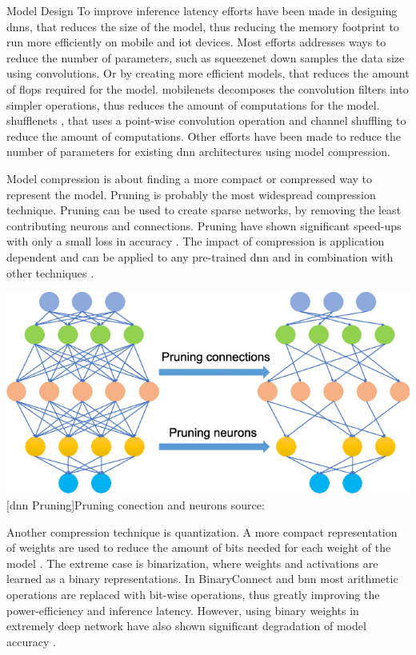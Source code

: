 \begin{enumdescript}
	\item[Model Design] To improve inference latency efforts have been made in designing \gls{dnn}s, that reduces the size of the model, thus reducing the memory footprint to run more efficiently on mobile and \gls{iot} devices. Most efforts addresses ways to reduce the number of parameters, such as \gls{squeezenet} \cite{iandola_squeezenet:_2016} down samples the data size using convolutions. Or by creating more efficient models, that reduces the amount of \acrshort{flop}s required for the model. \gls{mobilenet}s \cite{howard_mobilenets:_2017,sandler_mobilenetv2:_2018} decomposes the convolution filters into simpler operations, thus reduces the amount of computations for the model. \gls{shufflenet}s \cite{zhang_shufflenet:_2017, ma_shufflenet_2018}, that uses a point-wise convolution operation and channel shuffling to reduce the amount of computations. Other efforts have been made to reduce the number of parameters for existing \gls{dnn} architectures using model compression.
	
	\item[Model compression]  is about finding a more compact or compressed way to represent the model. Pruning is probably the most widespread compression technique. Pruning can be used to create sparse networks, by removing the least contributing neurons and connections. Pruning have shown significant speed-ups with only a small loss in accuracy \cite{zhou_edge_2019}. The impact of compression is application dependent and can be applied to any pre-trained \gls{dnn} and in combination with other techniques \cite{cheng_survey_2017}.
	
	\begin{minipage}[t]{\linewidth}
		\centering
		\includegraphics[width=.4\linewidth]{figures/articles/Pruning-a-neural-network}
		[\gls{dnn} Pruning]{Pruning conection and neurons source:  \cite{chen_deep_2019}}
	\end{minipage}
	
	Another compression technique is quantization. A more compact representation of weights are used to reduce the amount of bits needed for each weight of the model \cite{cheng_survey_2017}. The extreme case is binarization, where weights and activations are learned as a binary representations. In BinaryConnect \cite{courbariaux_binaryconnect:_2015} and \gls{bnn} \cite{courbariaux_binarized_2016} most arithmetic operations are replaced with bit-wise operations, thus greatly improving the power-efficiency and inference latency. However, using binary weights in extremely deep network have also shown significant degradation of model accuracy \cite{cheng_survey_2017}.
	

\end{enumdescript}
